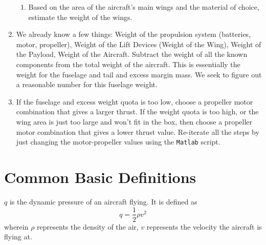 \documentclass[letter, 12pt]{article}
\begin{document}
\begin{center}
\begin{enumerate}
\begin{enumerate}
    \item Based on the area of the aircraft's main wings and the material of choice, estimate the weight of the wings.
    \end{enumerate}
\item We already know a few things: Weight of the propulsion system (batteries, motor, propeller), Weight of the Lift Devices (Weight of the Wing), Weight of the Payload, Weight of the Aircraft. Subtract the weight of all the known components from the total weight of the aircraft. This is essentially the weight for the fuselage and tail and excess margin mass. We seek to figure out a reasonable number for this fuselage weight.
\item If the fuselage and excess weight quota is too low, choose a propeller motor combination that gives a larger thrust. If the weight quota is too high, or the wing area is just too large and won't fit in the box, then choose a propeller motor combination that gives a lower thrust value. Re-iterate all the steps by just changing the motor-propeller values using the \texttt{Matlab} script.
\end{enumerate}

\section{Common Basic Definitions}
\begin{comment}
\end{comment}
$q$ is the dynamic pressure of an aircraft flying. It is defined as
$$q = \frac{1}{2}\rho v^{2}$$
wherein $\rho$ represents the density of the air, $v$ represents the velocity the aircraft is flying at.


\end{center}
\end{document}

